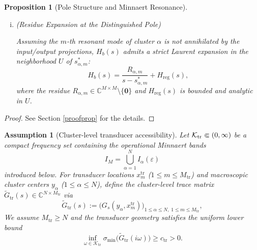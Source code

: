 \documentclass[11pt,a4paper]{article}
\numberwithin{equation}{section}
\newtheorem{proposition}[theorem]{Proposition}
\newtheorem{assumption}{Assumption}
\newcommand{\rankrev}[1]{{\color{rankclarification}#1}}
\begin{document}
\begin{proposition}[Pole Structure and Minnaert Resonance]
\begin{enumerate}[(i)]
    \item \big(\textit{Residue Expansion at the Distinguished Pole}\big)

    Assuming the $m$-th resonant mode of cluster $\alpha$ is not annihilated by the input/output projections, $H_b(s)$ admits a strict Laurent expansion in the neighborhood $U$ of $s_{\alpha, m}^\ast$:
    $$H_b(s) = \frac{R_{\alpha, m}}{s-s_{\alpha, m}^\ast} + H_{\mathrm{reg}}(s),$$
    where the residue $R_{\alpha, m} \in \mathbb{C}^{M \times M} \setminus \{\mathbf{0}\}$ and $H_{\mathrm{reg}}(s)$ is bounded and analytic in $U$. 
\end{enumerate}
\end{proposition}
\begin{proof}
    See Section \ref{proofprop} for the details.
\end{proof}


\begin{assumption}[Cluster-level transducer accessibility]
\label{ass:transducer-accessibility}
Let $\mathcal K_{\rm tr}\Subset(0,\infty)$ be a compact frequency set containing the operational Minnaert bands
\[
    I_M=\bigcup_{\alpha=1}^N I_\alpha(\varepsilon)
\]
introduced below. For transducer locations $x_m^{\mathrm{tr}}$ ($1 \le m \le M_{\mathrm{tr}}$) and macroscopic cluster centers $y_\alpha$ ($1 \le \alpha \le N$), define the cluster-level trace matrix $\widetilde{G}_{\mathrm{tr}}(s) \in \mathbb{C}^{N \times M_{\mathrm{tr}}}$ via
\begin{equation}
\label{eq:Gtr-tilde-assumption}
    \widetilde{G}_{\mathrm{tr}}(s) := \bigl(G_s(y_\alpha,x_m^{\mathrm{tr}})\bigr)_{1\le \alpha\le N,\;1\le m\le M_{\mathrm{tr}}} ,
\end{equation}
We assume $M_{\mathrm{tr}} \ge N$ and the transducer geometry satisfies the uniform lower bound
\begin{equation}
\label{eq:Gtr-tilde-full-rank}
    \inf_{\omega\in\mathcal{K}_{\mathrm{tr}}} \sigma_{\min}\bigl(\widetilde{G}_{\mathrm{tr}}(i\omega)\bigr) \ge c_{\mathrm{tr}} > 0 .
\end{equation}
\end{assumption}
\end{document}
